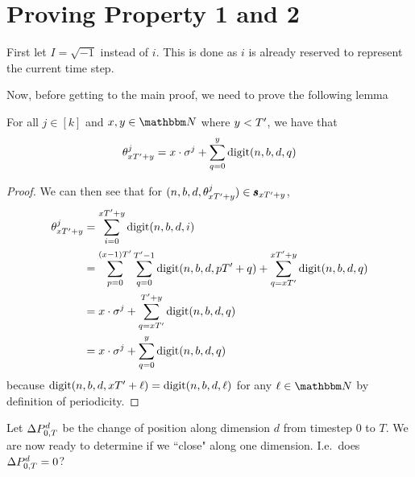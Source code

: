 \appendix
\section{Proving Property 1 and 2}
\label{appendix:prop1}

First let $I = \sqrt{-1}$ instead of $i$. This is done as $i$ is already reserved
to represent the current time step.

Now, before getting to the main proof, we need to prove the following lemma
\begin{lemma}{For all $j \in [k]$ and $x, y \in \N$ where $y < {T}'$, we have that 
  $$
    \theta_{xT' + y}^j = x\cdot \sigma^j + \sum_{q = 0}^y \mathrm{digit}(n, b, d, q)
  $$}
  \label{lemma:angleBreakdown}
  \begin{proof}
    We can then see that for $(n, b, d, \theta_{x{T}' + y}^j) \in \pmb{s}_{x{T}' + y}$,
    \begin{align*}
      {\theta^j_{x {T}'+ y}} &= \sum_{i = 0}^{x {T}' + y} \mathrm{digit}(n, b, d, i) \\
      &= \sum_{p = 0}^{(x- 1){T}'} \sum_{q=0}^{{T}' - 1} \mathrm{digit}(n, b, d, p{T}' + q)
          + \sum_{q = x {T}'}^{x {T}' + y} \mathrm{digit}(n, b, d, q)\\
      &= x \cdot \sigma^j + \sum_{q = x {T}'}^{{T}' + y}\mathrm{digit}(n, b, d, q)\\
      &= x \cdot \sigma^j + \sum_{q = 0}^{y}\mathrm{digit}(n, b, d, q)
    \end{align*}
    because $\mathrm{digit}(n, b, d, x{T}' + \ell) = \mathrm{digit}(n, b, d, \ell)$ for any $\ell \in \N$
    by definition of periodicity.
  \end{proof}
\end{lemma}

Let $\Delta P_{0, T}^d$ be the change of position along dimension $d$
from timestep 0 to $T$.
We are now ready to determine if we ``close" along one dimension. I.e.\ does
$
\Delta P_{0, T}^d = 0
$?


